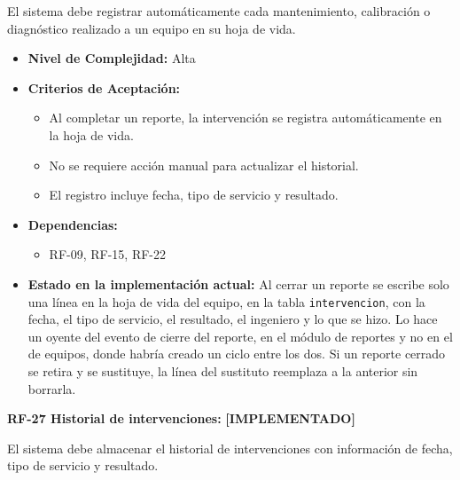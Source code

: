 \documentclass[12pt,a4paper]{article}
\newcommand{\estadoImplementado}{\textcolor{mainRed}{\textbf{[IMPLEMENTADO]}}}
\begin{document}
El sistema debe registrar automáticamente cada mantenimiento, calibración o diagnóstico realizado a un equipo en su hoja de vida.

\begin{itemize}
  \item \textbf{Nivel de Complejidad:} Alta

  \item \textbf{Criterios de Aceptación:}
  \begin{itemize}
    \item Al completar un reporte, la intervención se registra automáticamente en la hoja de vida.
    \item No se requiere acción manual para actualizar el historial.
    \item El registro incluye fecha, tipo de servicio y resultado.
  \end{itemize}

  \item \textbf{Dependencias:}
  \begin{itemize}
    \item RF-09, RF-15, RF-22
  \end{itemize}

  \item \textbf{Estado en la implementación actual:} Al cerrar un reporte se escribe solo una línea en la hoja de vida del equipo, en la tabla \texttt{intervencion}, con la fecha, el tipo de servicio, el resultado, el ingeniero y lo que se hizo. Lo hace un oyente del evento de cierre del reporte, en el módulo de reportes y no en el de equipos, donde habría creado un ciclo entre los dos. Si un reporte cerrado se retira y se sustituye, la línea del sustituto reemplaza a la anterior sin borrarla.
\end{itemize}

\textbf{RF-27 Historial de intervenciones:} \estadoImplementado{}

El sistema debe almacenar el historial de intervenciones con información de fecha, tipo de servicio y resultado.
\end{document}
